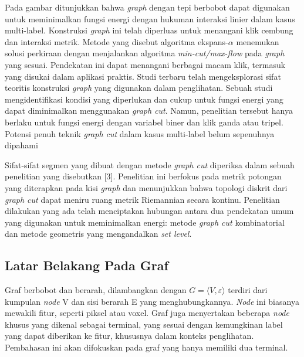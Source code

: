Pada gambar ditunjukkan bahwa \emph{graph} dengan tepi berbobot dapat digunakan untuk 
meminimalkan fungsi energi dengan hukuman interaksi linier dalam kasus multi-label. 
Konstruksi \emph{graph} ini telah diperluas untuk menangani klik cembung dan interaksi 
metrik. Metode yang disebut algoritma ekspans-\(\alpha\) menemukan solusi perkiraan 
dengan menjalankan algoritma \emph{min-cut/max-flow} pada \emph{graph} yang sesuai. 
Pendekatan ini dapat menangani berbagai macam klik, termasuk yang disukai dalam 
aplikasi praktis. Studi terbaru telah mengeksplorasi sifat teoritis konstruksi 
\emph{graph} yang digunakan dalam penglihatan. Sebuah studi mengidentifikasi kondisi 
yang diperlukan dan cukup untuk fungsi energi yang dapat diminimalkan menggunakan 
\emph{graph cut}. Namun, penelitian tersebut hanya berlaku untuk fungsi energi 
dengan variabel biner dan klik ganda atau tripel. Potensi penuh teknik \emph{graph cut} 
dalam kasus multi-label belum sepenuhnya dipahami

Sifat-sifat segmen yang dibuat dengan metode \emph{graph cut} diperiksa dalam 
sebuah penelitian yang disebutkan [3]. Penelitian ini berfokus pada metrik potongan 
yang diterapkan pada kisi \emph{graph} dan menunjukkan bahwa topologi diskrit dari 
\emph{graph cut} dapat meniru ruang metrik Riemannian secara kontinu. Penelitian 
dilakukan yang ada telah menciptakan hubungan antara dua pendekatan umum yang 
digunakan untuk meminimalkan energi: metode \emph{graph cut} kombinatorial 
dan metode geometris yang mengandalkan \emph{set level}.


\subsection{{Latar Belakang Pada Graf}}

Graf berbobot dan berarah, dilambangkan dengan \(G = \langle V, \varepsilon \rangle \) 
terdiri dari kumpulan \emph{node} V dan sisi berarah E yang menghubungkannya. 
\emph{Node} ini biasanya mewakili fitur, seperti piksel atau voxel. Graf juga 
menyertakan beberapa \emph{node} khusus yang dikenal sebagai terminal, yang sesuai 
dengan kemungkinan label yang dapat diberikan ke fitur, khususnya dalam konteks 
penglihatan. Pembahasan ini akan difokuskan pada graf yang hanya memiliki dua terminal.

